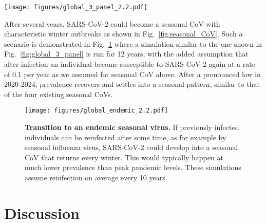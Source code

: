 \documentclass[rmp, reprint, superscriptaddress, floatfix,amsmath]{revtex4-1}
\newcommand{\forcing}{\varepsilon}
\begin{document}
\begin{figure*}[tb]
    \centering
    \texttt{[image: figures/global\_3\_panel\_2.2.pdf]}
    \caption{{\bf Extended circulation through overlapping epidemics in variable subpopulations.} These simulations of a pandemic scenario assume 1,000 sub-populations with an average $\langle R_0\rangle$ of 2.2 and standard deviation $0.5$, 40\% of which have weak seasonal forcing $\forcing \in [0,0.2]$ (tropical) and the remainder have strong variation with $\forcing \in [0.25,0.75]$. The super-position of many variable epidemics can result in a global prevalence that decays only slowly through 2020 and 2021. 
    Lighter lines have lower $R_0$, darker lines have higher $R_0$. 
    The actual observed case counts reported for Hubei are added (brown line) and multiplied by three to account for possible under-reporting of mild cases. A subset of 30 randomly chosen simulations are plotted for each region.
    Analogous figures for different $R_0$ parameter values are shown in Supplementary Fig.~\ref{fig:global_3_panel_supp}.}
    \label{fig:global_3_panel}
\end{figure*}

After several years, SARS-CoV-2 could become a seasonal CoV with characteristic winter outbreaks as shown in Fig.~\ref{fig:seasonal_CoV}.
Such a scenario is demonstrated in Fig.~\ref{fig:endemic} where a simulation similar to the one shown in Fig.~\ref{fig:global_3_panel} is run for 12 years, with the added assumption that after infection an individual become susceptible to SARS-CoV-2 again at a rate of 0.1 per year as we assumed for seasonal CoV above. 
After a pronounced low in 2020-2024, prevalence recovers and settles into a seasonal pattern, similar to that of the four existing seasonal CoVs. 

\begin{figure}
    \centering
    \texttt{[image: figures/global\_endemic\_2.2.pdf]}
    \caption{{\bf Transition to an endemic seasonal virus.} 
    If previously infected individuals can be reinfected after some time, as for example by seasonal influenza virus, SARS-CoV-2 could develop into a seasonal CoV that returns every winter. This would typically happen at much lower prevalence than peak pandemic levels. 
    These simulations assume reinfection on average every 10 years.}
    \label{fig:endemic}
\end{figure}

\section{Discussion}
\end{document}
